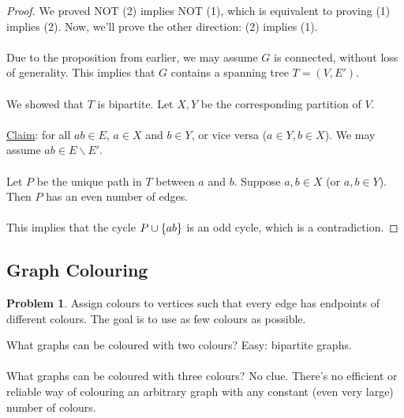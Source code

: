 \documentclass[]{article}
\theoremstyle{definition}
\newtheorem{problem}{Problem}[section]
\DeclarePairedDelimiter{\set}{\lbrace}{\rbrace}
\begin{document}
			\begin{proof}
				We proved NOT (2) implies NOT (1), which is equivalent to proving (1) implies (2). Now, we'll prove the other direction: (2) implies (1).
				\\ \\
				Due to the proposition from earlier, we may assume $G$ is connected, without loss of generality. This implies that $G$ contains a spanning tree $T = (V, E')$.
				\\ \\
				We showed that $T$ is bipartite. Let $X, Y$ be the corresponding partition of $V$.
				\\ \\
				\underline{Claim}: for all $ab \in E$, $a \in X$ and $b \in Y$, or vice versa ($a \in Y, b \in X$). We may assume $ab \in E \backslash E'$.
				\\ \\
				Let $P$ be the unique path in $T$ between $a$ and $b$. Suppose $a, b \in X$ (or $a, b \in Y$). Then $P$ has an even number of edges.
				\\ \\
				This implies that the cycle $P \cup \set{ab}$ is an odd cycle, which is a contradiction.
			\end{proof}

		\subsection{Graph Colouring}
			\begin{problem}
				Assign colours to vertices such that every edge has endpoints of different colours. The goal is to use as few colours as possible.
			\end{problem}

			What graphs can be coloured with two colours? Easy: bipartite graphs.
			\\ \\
			What graphs can be coloured with three colours? No clue. There's no efficient or reliable way of colouring an arbitrary graph with any constant (even very large) number of colours.
\end{document}
